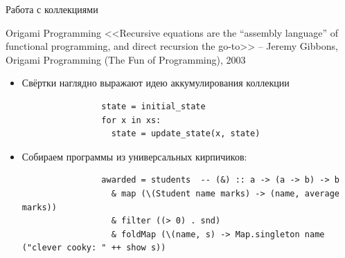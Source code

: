     \begin{frame}[fragile]{Работа с коллекциями \practicalslide}
        \begin{block}{Origami Programming}
            <<Recursive equations are the ``assembly language'' of functional programming, and direct recursion the go-to>>
            -- Jeremy Gibbons, Origami Programming (The Fun of Programming), 2003
        \end{block}
        \begin{itemize}
            \item Свёртки наглядно выражают идею аккумулирования коллекции
            \begin{verbatim}
                state = initial_state
                for x in xs:
                  state = update_state(x, state)
            \end{verbatim}
            \item Собираем программы из универсальных кирпичиков:
            \begin{verbatim}
                awarded = students  -- (&) :: a -> (a -> b) -> b
                  & map (\(Student name marks) -> (name, average marks))
                  & filter ((> 0) . snd)
                  & foldMap (\(name, s) -> Map.singleton name ("clever cooky: " ++ show s))
            \end{verbatim}
        \end{itemize}
    \end{frame}


